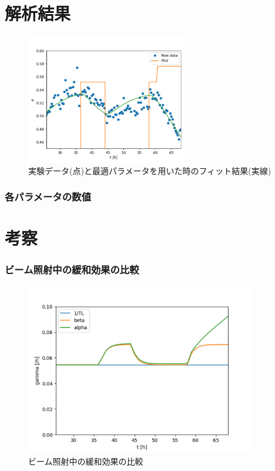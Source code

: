 \documentclass[a5j]{jsarticle}
\begin{document}
\part{解析結果}
\begin{figure}[h]
  \centering
  \includegraphics[width=7cm]{graph/fit.png}
  \caption{実験データ(点)と最適パラメータを用いた時のフィット結果(実線)}
\end{figure}
\section{各パラメータの数値}

\part{考察}
\section{ビーム照射中の緩和効果の比較}
\begin{figure}[h]
  \centering
  \includegraphics[width=10cm]{graph/comparison.png}
  \caption{ビーム照射中の緩和効果の比較}
\end{figure}
\end{document}

